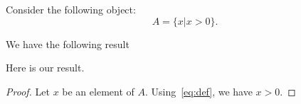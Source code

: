 \begin{definition}
	Consider the following object:
	\begin{equation}
		\label{eq:def}
		A = \{ x | x > 0 \}.
	\end{equation}
\end{definition}

We have the following result

\begin{theorem}
	\label{th}
	Here is our result.
\end{theorem}

\begin{proof}
	Let $x$ be an element of $A$.
	Using~\eqref{eq:def}, we have $x>0$.
\end{proof}